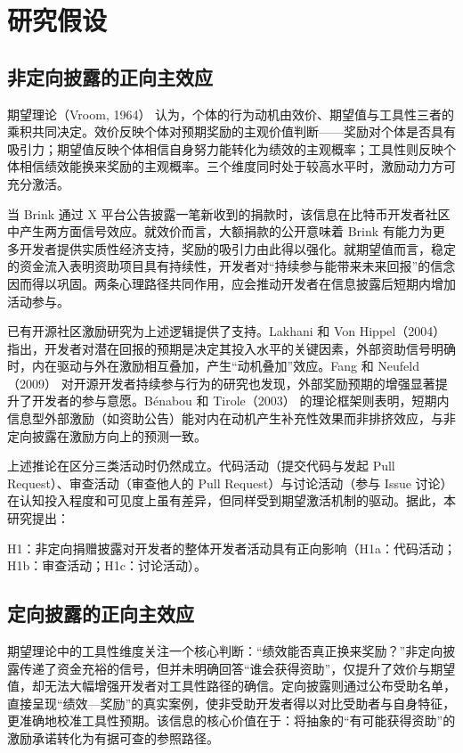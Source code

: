 \section{研究假设}
\label{sec:hypotheses-1}

\subsection{非定向披露的正向主效应}

期望理论（Vroom, 1964）\cite{vroom1964work} 认为，个体的行为动机由效价、期望值与工具性三者的乘积共同决定。效价反映个体对预期奖励的主观价值判断——奖励对个体是否具有吸引力；期望值反映个体相信自身努力能转化为绩效的主观概率；工具性则反映个体相信绩效能换来奖励的主观概率。三个维度同时处于较高水平时，激励动力方可充分激活。

当 Brink 通过 X 平台公告披露一笔新收到的捐款时，该信息在比特币开发者社区中产生两方面信号效应。就效价而言，大额捐款的公开意味着 Brink 有能力为更多开发者提供实质性经济支持，奖励的吸引力由此得以强化。就期望值而言，稳定的资金流入表明资助项目具有持续性，开发者对“持续参与能带来未来回报”的信念因而得以巩固。两条心理路径共同作用，应会推动开发者在信息披露后短期内增加活动参与。

已有开源社区激励研究为上述逻辑提供了支持。Lakhani 和 Von Hippel（2004）\cite{lakhani2003open} 指出，开发者对潜在回报的预期是决定其投入水平的关键因素，外部资助信号明确时，内在驱动与外在激励相互叠加，产生“动机叠加”效应。Fang 和 Neufeld（2009）\cite{fang2009understanding} 对开源开发者持续参与行为的研究也发现，外部奖励预期的增强显著提升了开发者的参与意愿。B\'{e}nabou 和 Tirole（2003）\cite{benabou2003intrinsic} 的理论框架则表明，短期内信息型外部激励（如资助公告）能对内在动机产生补充性效果而非排挤效应，与非定向披露在激励方向上的预测一致。

上述推论在区分三类活动时仍然成立。代码活动（提交代码与发起 Pull Request）、审查活动（审查他人的 Pull Request）与讨论活动（参与 Issue 讨论）在认知投入程度和可见度上虽有差异，但同样受到期望激活机制的驱动。据此，本研究提出：

H1：非定向捐赠披露对开发者的整体开发者活动具有正向影响（H1a：代码活动；H1b：审查活动；H1c：讨论活动）。

\subsection{定向披露的正向主效应}

期望理论中的工具性维度关注一个核心判断：“绩效能否真正换来奖励？”非定向披露传递了资金充裕的信号，但并未明确回答“谁会获得资助”，仅提升了效价与期望值，却无法大幅增强开发者对工具性路径的确信。定向披露则通过公布受助名单，直接呈现“绩效—奖励”的真实案例，使非受助开发者得以对比受助者与自身特征，更准确地校准工具性预期。该信息的核心价值在于：将抽象的“有可能获得资助”的激励承诺转化为有据可查的参照路径。

